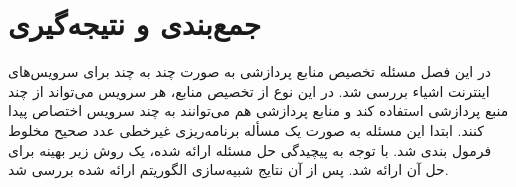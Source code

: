   \section{جمع‌بندی و نتیجه‌گیری}
    در این فصل مسئله تخصیص منابع پردازشی به صورت چند به چند برای سرویس‌های اینترنت اشیاء بررسی شد.
    در این نوع از تخصیص منابع، هر سرویس می‌تواند از چند منبع پردازشی استفاده کند و منابع پردازشی هم می‌توانند به چند سرویس اختصاص پیدا کنند.
    ابتدا این مسئله به صورت یک مسأله برنامه‌ریزی غیرخطی عدد صحیح مخلوط فرمول بندی شد.
    با توجه به پیچیدگی حل مسئله ارائه شده، یک روش زیر بهینه برای حل آن ارائه شد.
    پس از آن نتایج شبیه‌سازی الگوریتم ارائه شده بررسی شد.

